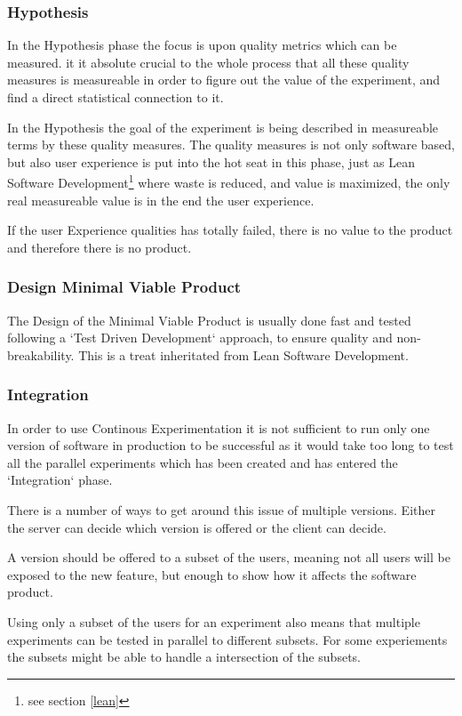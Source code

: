 \documentclass{sig-alternate}
\begin{document}
\subsubsection{Hypothesis}
\label{cx:hypothesis}
In the Hypothesis phase the focus is upon quality metrics which can be measured.
it it absolute crucial to the whole process that all these quality measures is measureable in order to figure 
out the value of the experiment, and find a direct statistical connection to it. 

In the Hypothesis the goal of the experiment is being described in measureable terms by these quality measures. 
The quality measures is not only software based, but also user experience is put into the hot seat in this 
phase, just as Lean Software Development\footnote{\label{see-lean}see section \ref{lean}} where waste is reduced, and value is maximized, the only real measureable value is in the end the user experience. 

If the user Experience qualities has totally failed, there is no value to the product and therefore there is 
no product.

\subsubsection{Design Minimal Viable Product}
\label{cx:design}
The Design of the Minimal Viable Product is usually done fast and tested following a `Test Driven Development`
approach, to ensure quality and non-breakability. 
This is a treat inheritated from Lean Software Development\footnotemark[\ref{see-lean}].

\subsubsection{Integration}
\label{cx:integration}
In order to use Continous Experimentation it is not sufficient to run only one version of software in 
production to be successful as it would take too long to test all the parallel experiments which has been
created and has entered the `Integration` phase. 

There is a number of ways to get around this issue of multiple versions. 
Either the server can decide which version is offered or the client can decide.

A version should be offered to a subset of the users, meaning not all users will be exposed to the 
new feature, but enough to show how it affects the software product.

Using only a subset of the users for an experiment also means that multiple experiments can be tested in 
parallel to different subsets. For some experiements the subsets might be able to handle a intersection of 
the subsets. 
\end{document}
